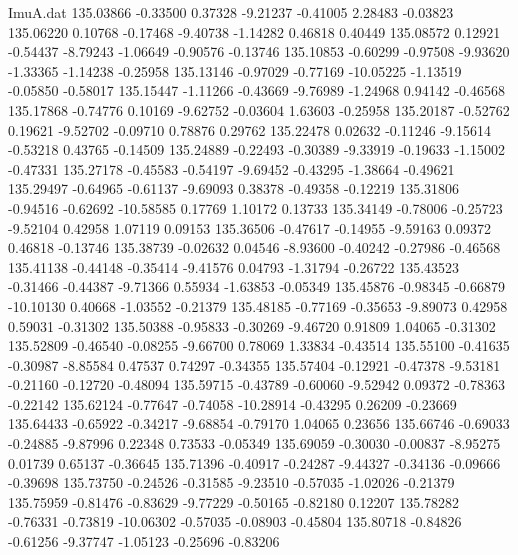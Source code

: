 \begin{filecontents}{ImuA.dat}
 135.03866   -0.33500    0.37328   -9.21237   -0.41005    2.28483   -0.03823
 135.06220    0.10768   -0.17468   -9.40738   -1.14282    0.46818    0.40449
 135.08572    0.12921   -0.54437   -8.79243   -1.06649   -0.90576   -0.13746
 135.10853   -0.60299   -0.97508   -9.93620   -1.33365   -1.14238   -0.25958
 135.13146   -0.97029   -0.77169  -10.05225   -1.13519   -0.05850   -0.58017
 135.15447   -1.11266   -0.43669   -9.76989   -1.24968    0.94142   -0.46568
 135.17868   -0.74776    0.10169   -9.62752   -0.03604    1.63603   -0.25958
 135.20187   -0.52762    0.19621   -9.52702   -0.09710    0.78876    0.29762
 135.22478    0.02632   -0.11246   -9.15614   -0.53218    0.43765   -0.14509
 135.24889   -0.22493   -0.30389   -9.33919   -0.19633   -1.15002   -0.47331
 135.27178   -0.45583   -0.54197   -9.69452   -0.43295   -1.38664   -0.49621
 135.29497   -0.64965   -0.61137   -9.69093    0.38378   -0.49358   -0.12219
 135.31806   -0.94516   -0.62692  -10.58585    0.17769    1.10172    0.13733
 135.34149   -0.78006   -0.25723   -9.52104    0.42958    1.07119    0.09153
 135.36506   -0.47617   -0.14955   -9.59163    0.09372    0.46818   -0.13746
 135.38739   -0.02632    0.04546   -8.93600   -0.40242   -0.27986   -0.46568
 135.41138   -0.44148   -0.35414   -9.41576    0.04793   -1.31794   -0.26722
 135.43523   -0.31466   -0.44387   -9.71366    0.55934   -1.63853   -0.05349
 135.45876   -0.98345   -0.66879  -10.10130    0.40668   -1.03552   -0.21379
 135.48185   -0.77169   -0.35653   -9.89073    0.42958    0.59031   -0.31302
 135.50388   -0.95833   -0.30269   -9.46720    0.91809    1.04065   -0.31302
 135.52809   -0.46540   -0.08255   -9.66700    0.78069    1.33834   -0.43514
 135.55100   -0.41635   -0.30987   -8.85584    0.47537    0.74297   -0.34355
 135.57404   -0.12921   -0.47378   -9.53181   -0.21160   -0.12720   -0.48094
 135.59715   -0.43789   -0.60060   -9.52942    0.09372   -0.78363   -0.22142
 135.62124   -0.77647   -0.74058  -10.28914   -0.43295    0.26209   -0.23669
 135.64433   -0.65922   -0.34217   -9.68854   -0.79170    1.04065    0.23656
 135.66746   -0.69033   -0.24885   -9.87996    0.22348    0.73533   -0.05349
 135.69059   -0.30030   -0.00837   -8.95275    0.01739    0.65137   -0.36645
 135.71396   -0.40917   -0.24287   -9.44327   -0.34136   -0.09666   -0.39698
 135.73750   -0.24526   -0.31585   -9.23510   -0.57035   -1.02026   -0.21379
 135.75959   -0.81476   -0.83629   -9.77229   -0.50165   -0.82180    0.12207
 135.78282   -0.76331   -0.73819  -10.06302   -0.57035   -0.08903   -0.45804
 135.80718   -0.84826   -0.61256   -9.37747   -1.05123   -0.25696   -0.83206

\end{filecontents}
